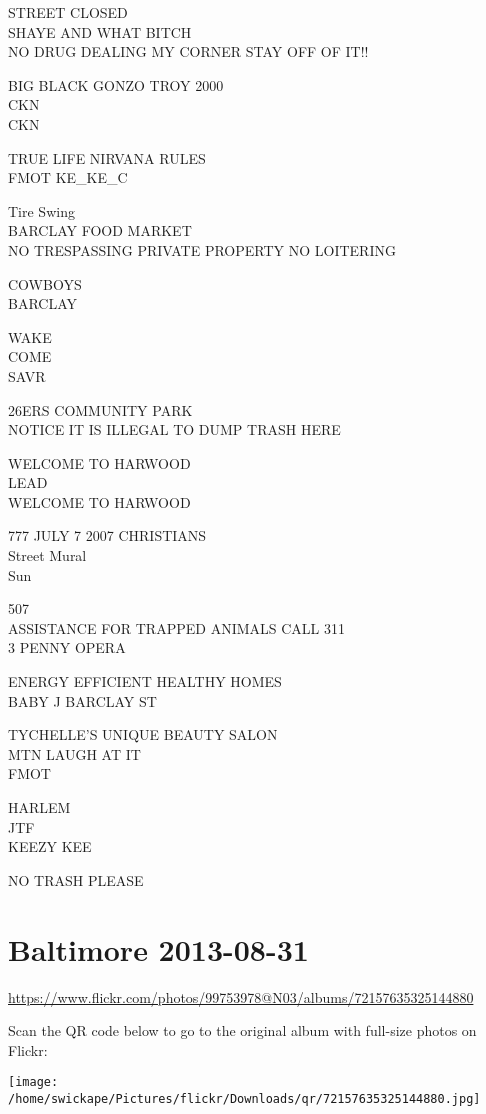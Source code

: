 \documentclass[10pt,letterpaper]{article}
\begin{document}
STREET CLOSED\\
SHAYE AND WHAT BITCH\\
NO DRUG DEALING MY CORNER STAY OFF OF IT!!

BIG BLACK GONZO TROY 2000\\
CKN\\
CKN

TRUE LIFE NIRVANA RULES\\
FMOT KE\_KE\_C

Tire Swing\\
BARCLAY FOOD MARKET\\
NO TRESPASSING PRIVATE PROPERTY NO LOITERING

COWBOYS\\
BARCLAY

WAKE\\
COME\\
SAVR

26ERS COMMUNITY PARK\\
NOTICE IT IS ILLEGAL TO DUMP TRASH HERE

WELCOME TO HARWOOD\\
LEAD\\
WELCOME TO HARWOOD

777 JULY 7 2007 CHRISTIANS\\
Street Mural\\
Sun

507\\
ASSISTANCE FOR TRAPPED ANIMALS CALL 311\\
3 PENNY OPERA

ENERGY EFFICIENT HEALTHY HOMES\\
BABY J BARCLAY ST

TYCHELLE'S UNIQUE BEAUTY SALON\\
MTN LAUGH AT IT\\
FMOT

HARLEM\\
JTF\\
KEEZY KEE

NO TRASH PLEASE


\section*{Baltimore 2013-08-31}

\url{https://www.flickr.com/photos/99753978@N03/albums/72157635325144880}

Scan the QR code below to go to the original album with full-size photos on Flickr:

\texttt{[image: /home/swickape/Pictures/flickr/Downloads/qr/72157635325144880.jpg]}
\end{document}

